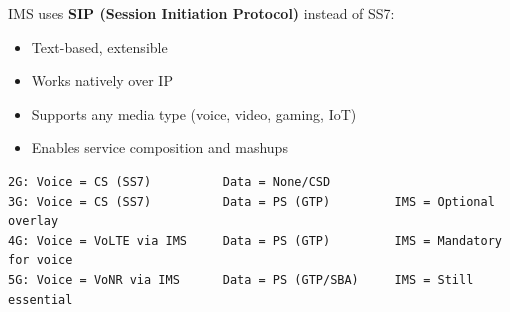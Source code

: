 
IMS uses \textbf{SIP (Session Initiation Protocol)} instead of SS7:

\begin{itemize}
\tightlist
\item
  Text-based, extensible
\item
  Works natively over IP
\item
  Supports any media type (voice, video, gaming, IoT)
\item
  Enables service composition and mashups
\end{itemize}


\def\CNcodelang{}

\begin{CNplaincode}
\begin{Verbatim}
2G: Voice = CS (SS7)          Data = None/CSD
3G: Voice = CS (SS7)          Data = PS (GTP)         IMS = Optional overlay
4G: Voice = VoLTE via IMS     Data = PS (GTP)         IMS = Mandatory for voice
5G: Voice = VoNR via IMS      Data = PS (GTP/SBA)     IMS = Still essential
\end{Verbatim}
\end{CNplaincode}



